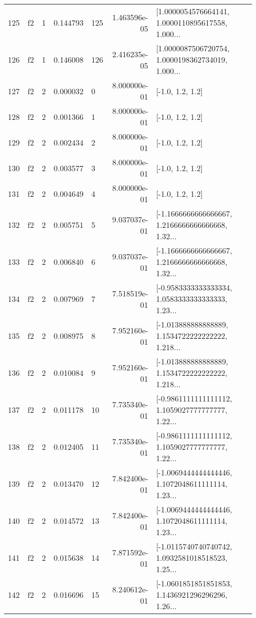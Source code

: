 \begin{tabular}{lllrlrl}
125 &  f2 &   1 &  0.144793 &  125 &  1.463596e-05 &  [1.0000054576664141, 1.0000110895617558, 1.000... \\
126 &  f2 &   1 &  0.146008 &  126 &  2.416235e-05 &  [1.0000087506720754, 1.0000198362734019, 1.000... \\
127 &  f2 &   2 &  0.000032 &    0 &  8.000000e-01 &                                   [-1.0, 1.2, 1.2] \\
128 &  f2 &   2 &  0.001366 &    1 &  8.000000e-01 &                                   [-1.0, 1.2, 1.2] \\
129 &  f2 &   2 &  0.002434 &    2 &  8.000000e-01 &                                   [-1.0, 1.2, 1.2] \\
130 &  f2 &   2 &  0.003577 &    3 &  8.000000e-01 &                                   [-1.0, 1.2, 1.2] \\
131 &  f2 &   2 &  0.004649 &    4 &  8.000000e-01 &                                   [-1.0, 1.2, 1.2] \\
132 &  f2 &   2 &  0.005751 &    5 &  9.037037e-01 &  [-1.1666666666666667, 1.2166666666666668, 1.32... \\
133 &  f2 &   2 &  0.006840 &    6 &  9.037037e-01 &  [-1.1666666666666667, 1.2166666666666668, 1.32... \\
134 &  f2 &   2 &  0.007969 &    7 &  7.518519e-01 &  [-0.9583333333333334, 1.0583333333333333, 1.23... \\
135 &  f2 &   2 &  0.008975 &    8 &  7.952160e-01 &  [-1.013888888888889, 1.1534722222222222, 1.218... \\
136 &  f2 &   2 &  0.010084 &    9 &  7.952160e-01 &  [-1.013888888888889, 1.1534722222222222, 1.218... \\
137 &  f2 &   2 &  0.011178 &   10 &  7.735340e-01 &  [-0.9861111111111112, 1.1059027777777777, 1.22... \\
138 &  f2 &   2 &  0.012405 &   11 &  7.735340e-01 &  [-0.9861111111111112, 1.1059027777777777, 1.22... \\
139 &  f2 &   2 &  0.013470 &   12 &  7.842400e-01 &  [-1.0069444444444446, 1.1072048611111114, 1.23... \\
140 &  f2 &   2 &  0.014572 &   13 &  7.842400e-01 &  [-1.0069444444444446, 1.1072048611111114, 1.23... \\
141 &  f2 &   2 &  0.015638 &   14 &  7.871592e-01 &  [-1.0115740740740742, 1.0932581018518523, 1.25... \\
142 &  f2 &   2 &  0.016696 &   15 &  8.240612e-01 &  [-1.0601851851851853, 1.1436921296296296, 1.26... \\

\end{tabular}
